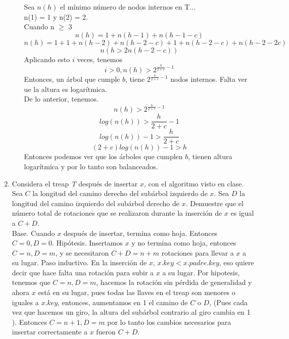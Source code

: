 \documentclass[spanish,12pt,letterpaper]{article}
\begin{document}
\begin{enumerate}
\begin{enumerate}[a)]
    Sea $n(h)$ el mínimo número de nodos internos en T...\\
    n(1) = 1 y n(2) = 2.\\
    Cuando n $\geq$ 3
    \[n(h) = 1 + n(h-1) + n(h-1-c)\]
    \[n(h) = 1 + 1 + n(h-2) + n(h-2-c) + 1 + n(h-2-c) + n(h-2-2c)\]
    \[n(h > 2n(h-2-c))\]
    Aplicando esto $i$ veces, tenemos
    \[i > 0, n(h) > 2^{\frac{h}{2+c}-1}\]
    Entonces, un árbol que cumple $b$, tiene $2^{\frac{h}{2+c}-1}$ nodos internos.
    Falta ver ue la altura es logarítmica.\\
    De lo anterior, tenemos.
    \[n(h) > 2^{\frac{h}{2+c}-1}\]
    \[log(n(h)) > \frac{h}{2+c}-1\]
    \[log(n(h))-1 > \frac{h}{2+c}\]
    \[(2+c)log(n(h))-1 > h\]
    Entonces podemos ver que los árboles que cumplen $b$, tienen altura
    logarítmica y por lo tanto son balanceados.
  \end{enumerate}
  
\item Considera el treap \textit{T} después de insertar $x$, con el algoritmo
  visto en clase. Sea $C$ la longitud del camino derecho del subárbol izquierdo
  de $x$. Sea $D$ la longitud del camino izquierdo del subárbol derecho de $x$.
  Demuestre que el número total de rotaciones que se realizaron durante la
  inserción de $x$ es igual a $C + D$.\\
  Base. Cuando $x$ después de insertar, termina como hoja. Entonces $C = 0,
  D = 0$.
  Hipótesis. Insertamos $x$ y no termina como hoja, entonces $C = n, D = m$, y se
  necesitaron $C+D = n+m$ rotaciones para llevar a $x$ a su lugar.
  Paso inductivo. En la inserción de $x$, $x.key < x.padre.key$, eso quiere decir
  que hace falta una rotación para subir a $x$ a su lugar. Por hipotesis, tenemos
  que $C = n, D = m$, hacemos la rotación sin pérdida de generalidad y ahora $x$
  está en su lugar, pues todas las llaves en el treap son menores o iguales a
  $x.key$, entonces, aumentamos en 1 el camino de $C$ o $D$, (Pues cada vez que
  hacemos un giro, la altura del subárbol contrario al giro cambia en 1 ).
  Entonces $C = n+1, D = m$ por lo tanto los cambios necesarios para insertar
  correctamente a $x$ fueron $C+D$.
  

\end{enumerate}
\end{document}
